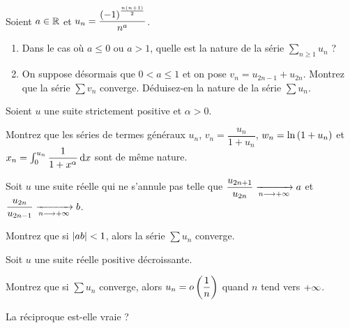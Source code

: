 \begin{corr}
\end{corr}

\begin{exoss}[Exercice 13]~\\
Soient \(a\in\mathbb{R}\) et \(u_n=\dfrac{\left(-1\right)^{\frac{n\left(n+1\right)}{2}}}{n^a}\).

\begin{enumerate}
    \item Dans le cas où \(a\leq0\) ou \(a>1\), quelle est la nature de la série \(\sum_{n\geq1}u_n\) ? \\
    \item On suppose désormais que \(0<a\leq1\) et on pose \(v_n=u_{2n-1}+u_{2n}\). Montrez que la série \(\sum v_n\) converge. Déduisez-en la nature de la série \(\sum u_n\).
\end{enumerate}
\end{exoss}

\begin{corr}
\end{corr}

\begin{exoss}[Exercice 14]
Soient \(u\) une suite strictement positive et \(\alpha>0\).

Montrez que les séries de termes généraux \(u_n\), \(v_n=\dfrac{u_n}{1+u_n}\), \(w_n=\ln\left(1+u_n\right)\) et \(x_n=\int_0^{u_n}\dfrac{1}{1+x^\alpha}\odif{x}\) sont de même nature.
\end{exoss}

\begin{corr}
\end{corr}

\begin{exoss}[Exercice 15]
Soit \(u\) une suite réelle qui ne s'annule pas telle que \(\dfrac{u_{2n+1}}{u_{2n}}\xrightarrow[n\longrightarrow+\infty]{}a\) et \(\dfrac{u_{2n}}{u_{2n-1}}\xrightarrow[n\longrightarrow+\infty]{}b\).

Montrez que si \(\left\lvert ab\right\rvert<1\), alors la série \(\sum u_n\) converge.
\end{exoss}

\begin{corr}
\end{corr}

\begin{exoss}[Exercice 16]
Soit \(u\) une suite réelle positive décroissante.

Montrez que si \(\sum u_n\) converge, alors \(u_n=o\left(\dfrac{1}{n}\right)\) quand \(n\) tend vers \(+\infty\).

La réciproque est-elle vraie ?
\end{exoss}

